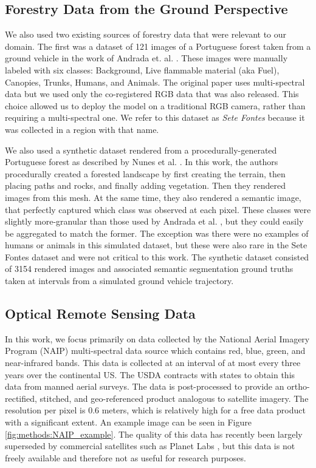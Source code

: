 \subsection{Forestry Data from the Ground Perspective}
We also used two existing sources of forestry data that were relevant to our domain. The first was a dataset of 121 images of a Portuguese forest taken from a ground vehicle in the work of Andrada et. al. \cite{Andrada2020}. These images were manually labeled with six classes: Background, Live flammable material (aka Fuel), Canopies, Trunks, Humans, and Animals. The original paper uses multi-spectral data but we used only the co-registered RGB data that was also released. This choice allowed us to deploy the model on a traditional RGB camera, rather than requiring a multi-spectral one. We refer to this dataset as \textit{Sete Fontes} because it was collected in a region with that name.

We also used a synthetic dataset rendered from a procedurally-generated Portuguese forest as described by Nunes et al. \cite{nunes2021procedural}. In this work, the authors procedurally created a forested landscape by first creating the terrain, then placing paths and rocks, and finally adding vegetation. Then they rendered images from this mesh. At the same time, they also rendered a semantic image, that perfectly captured which class was observed at each pixel. These classes were slightly more-granular than those used by Andrada et al. \cite{Andrada2020}, but they could easily be aggregated to match the former. The exception was there were no examples of humans or animals in this simulated dataset, but these were also rare in the Sete Fontes dataset and were not critical to this work. The synthetic dataset consisted of 3154 rendered images and associated semantic segmentation ground truths taken at intervals from a simulated ground vehicle trajectory. 

\subsection{Optical Remote Sensing Data}
In this work, we focus primarily on data collected by the National Aerial Imagery Program (NAIP) multi-spectral data source which contains red, blue, green, and near-infrared bands. This data is collected at an interval of at most every three years over the continental US. The USDA contracts with states to obtain this data from manned aerial surveys. The data is post-processed to provide an ortho-rectified, stitched, and geo-referenced product analogous to satellite imagery. The resolution per pixel is 0.6 meters, which is relatively high for a free data product with a significant extent. An example image can be seen in Figure \ref{fig:methods:NAIP_example}. The quality of this data has recently been largely superseded by commercial satellites such as Planet Labs \cite{Planet}, but this data is not freely available and therefore not as useful for research purposes. 

